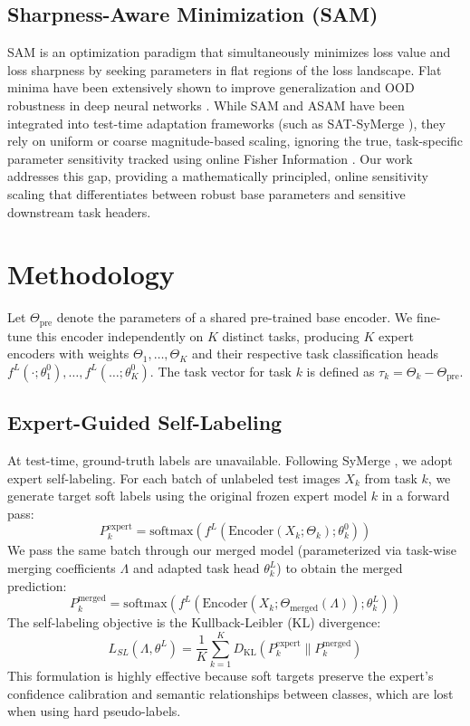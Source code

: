 \documentclass{article}
\begin{document}
\subsection{Sharpness-Aware Minimization (SAM)}
SAM \cite{foret21sam} is an optimization paradigm that simultaneously minimizes loss value and loss sharpness by seeking parameters in flat regions of the loss landscape. Flat minima have been extensively shown to improve generalization and OOD robustness in deep neural networks \cite{cha21swad}. While SAM and ASAM have been integrated into test-time adaptation frameworks (such as SAT-SyMerge \cite{sata26tta}), they rely on uniform or coarse magnitude-based scaling, ignoring the true, task-specific parameter sensitivity tracked using online Fisher Information \cite{sbf26fisher}. Our work addresses this gap, providing a mathematically principled, online sensitivity scaling that differentiates between robust base parameters and sensitive downstream task headers.

\section{Methodology}
\label{sec:method}
Let $\Theta_{\text{pre}}$ denote the parameters of a shared pre-trained base encoder. We fine-tune this encoder independently on $K$ distinct tasks, producing $K$ expert encoders with weights $\Theta_1, \dots, \Theta_K$ and their respective task classification heads $f^L(\cdot; \theta^0_1), \dots, f^L(\dots; \theta^0_K)$. The task vector for task $k$ is defined as $\tau_k = \Theta_k - \Theta_{\text{pre}}$.

\subsection{Expert-Guided Self-Labeling}
At test-time, ground-truth labels are unavailable. Following SyMerge \cite{jung26symerge}, we adopt expert self-labeling. For each batch of unlabeled test images $X_k$ from task $k$, we generate target soft labels using the original frozen expert model $k$ in a forward pass:
\begin{equation}
    P^{\text{expert}}_k = \text{softmax}(f^L(\text{Encoder}(X_k; \Theta_k); \theta^0_k))
\end{equation}
We pass the same batch through our merged model (parameterized via task-wise merging coefficients $\Lambda$ and adapted task head $\theta^L_k$) to obtain the merged prediction:
\begin{equation}
    P^{\text{merged}}_k = \text{softmax}(f^L(\text{Encoder}(X_k; \Theta_{\text{merged}}(\Lambda)); \theta^L_k))
\end{equation}
The self-labeling objective is the Kullback-Leibler (KL) divergence:
\begin{equation}
    L_{SL}(\Lambda, \theta^L) = \frac{1}{K}\sum_{k=1}^K D_{\text{KL}}(P^{\text{expert}}_k \parallel P^{\text{merged}}_k)
\end{equation}
This formulation is highly effective because soft targets preserve the expert's confidence calibration and semantic relationships between classes, which are lost when using hard pseudo-labels.
\end{document}

